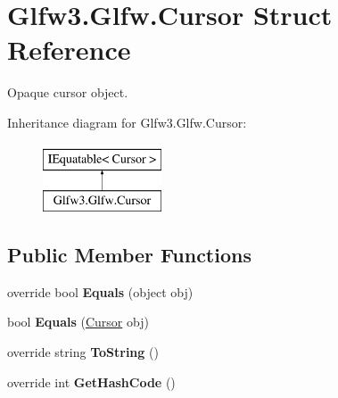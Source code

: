 \hypertarget{struct_glfw3_1_1_glfw_1_1_cursor}{}\section{Glfw3.\+Glfw.\+Cursor Struct Reference}
\label{struct_glfw3_1_1_glfw_1_1_cursor}


Opaque cursor object.  


Inheritance diagram for Glfw3.\+Glfw.\+Cursor\+:\begin{figure}[H]
\begin{center}
\leavevmode
\includegraphics[height=2.000000cm]{struct_glfw3_1_1_glfw_1_1_cursor}
\end{center}
\end{figure}
\subsection*{Public Member Functions}
\begin{DoxyCompactItemize}
\item 
\mbox{\label{struct_glfw3_1_1_glfw_1_1_cursor_abdc3304db2d85d2812fff80ee6d7e845}} 
override bool {\bfseries Equals} (object obj)
\item 
\mbox{\label{struct_glfw3_1_1_glfw_1_1_cursor_af4b4b0e4ce88cd5219bc38cf5b11a847}} 
bool {\bfseries Equals} (\mbox{\hyperlink{struct_glfw3_1_1_glfw_1_1_cursor}{Cursor}} obj)
\item 
\mbox{\label{struct_glfw3_1_1_glfw_1_1_cursor_aa81dc4e90d7b4a96de6afe72e3588507}} 
override string {\bfseries To\+String} ()
\item 
\mbox{\label{struct_glfw3_1_1_glfw_1_1_cursor_a6ff8abae5c2658290b4817b76e9a65b3}} 
override int {\bfseries Get\+Hash\+Code} ()
\end{DoxyCompactItemize}
